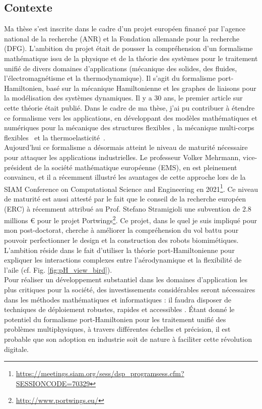 \documentclass[french]{article}
\begin{document}
\subsection{Contexte}


Ma thèse s'est inscrite dans le cadre d'un projet européen financé par l'agence national de la recherche (ANR) et la Fondation allemande pour la recherche (DFG). L'ambition du projet était de pousser la compréhension d'un formalisme mathématique issu de la physique et de la théorie des systèmes pour le traitement unifié de divers domaines d'applications (mécanique des solides, des fluides, l'électromagnétisme et la thermodynamique). Il s'agit du formalisme port-Hamiltonien, bas\'e sur la mécanique Hamiltonienne et les graphes de liaisons pour la modélisation des systèmes dynamiques. Il y a 30 ans, le premier article sur cette théorie était publié. Dans le cadre de ma thèse, j'ai pu contribuer \`a étendre ce formalisme vers les applications, en développant des modèles mathématiques et numériques pour la mécanique des structures flexibles \cite{brugnoli2019ammmin,brugnoli2019ammkir}, la mécanique multi-corps flexibles~\cite{brugnoli2020msd} et la thermoelasticit\'e~\cite{brugnoli2021ther}. \\

Aujourd'hui ce formalisme a désormais atteint le niveau de maturit\'e nécessaire pour attaquer les applications industrielles. Le professeur Volker Mehrmann, vice-président de la société mathématique européenne (EMS), en est pleinement convaincu, et il a récemment illustré les avantages de cette approche  lors de la SIAM Conference on Computational Science and Engineering en 2021\footnote{\url{https://meetings.siam.org/sess/dsp_programsess.cfm?SESSIONCODE=70329}}. Ce niveau de maturit\'e est aussi attesté par le fait que le conseil de la recherche européen (ERC) \`a récemment attribu\'e au Prof. Stefano Stramigioli une subvention de 2.8 millions \euro{} pour le projet Portwings\footnote{\url{http://www.portwings.eu/}}. Ce projet, dans le quel je suis impliqu\'e pour mon post-doctorat, cherche \`a améliorer la compréhension du vol battu pour pouvoir perfectionner le design et la construction des robots biomimétiques. L'ambition réside dans le fait d'utiliser la théorie port-Hamiltonienne pour expliquer les interactions complexes entre l'aérodynamique et la flexibilit\'e de l'aile (cf. Fig. \ref{fig:pH_view_bird}). \\

Pour réaliser un développement substantiel dans les domaines d'application les plus critiques pour la société, des investissements considérables seront nécessaires dans les méthodes mathématiques et informatiques : il faudra disposer  de techniques de déploiement robustes, rapides et accessibles \cite{niederer2021}. Étant donné le potentiel du formalisme port-Hamiltonien pour les traitement unifié des problèmes multiphysiques, \`a travers différentes échelles et précision, il est probable que son adoption en industrie soit de nature \`a faciliter cette révolution digitale. 
\end{document}
